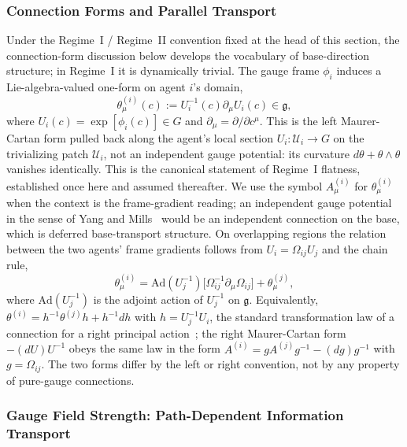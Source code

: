 \subsubsection{Connection Forms and Parallel Transport}
\label{sec:connection_forms}

Under the Regime~I / Regime~II convention fixed at the head of this section, the connection-form discussion below develops the vocabulary of base-direction structure; in Regime~I it is dynamically trivial. The gauge frame $\phi_i$ induces a Lie-algebra-valued one-form on agent $i$'s domain,
\begin{equation}
\theta^{(i)}_\mu(c) := U_i^{-1}(c) \partial_\mu U_i(c) \in \mathfrak{g},
\label{eq:connection_form}
\end{equation}
where $U_i(c) = \exp[\phi_i(c)] \in G$ and $\partial_\mu = \partial/\partial c^\mu$. This is the left Maurer-Cartan form pulled back along the agent's local section $U_i: \mathcal{U}_i \to G$ on the trivializing patch $\mathcal{U}_i$, not an independent gauge potential: its curvature $d\theta + \theta \wedge \theta$ vanishes identically. This is the canonical statement of Regime~I flatness, established once here and assumed thereafter. We use the symbol $A^{(i)}_\mu$ for $\theta^{(i)}_\mu$ when the context is the frame-gradient reading; an independent gauge potential in the sense of Yang and Mills~\cite{Yang1954, Utiyama1956} would be an independent connection on the base, which is deferred base-transport structure. On overlapping regions the relation between the two agents' frame gradients follows from $U_i = \Omega_{ij} U_j$ and the chain rule,
\begin{equation}
\theta^{(i)}_\mu = \mathrm{Ad}(U_j^{-1})\big[\Omega_{ij}^{-1} \partial_\mu \Omega_{ij}\big] + \theta^{(j)}_\mu,
\label{eq:theta_overlap_relation}
\end{equation}
where $\mathrm{Ad}(U_j^{-1})$ is the adjoint action of $U_j^{-1}$ on $\mathfrak{g}$. Equivalently, $\theta^{(i)} = h^{-1}\theta^{(j)}h + h^{-1}dh$ with $h = U_j^{-1}U_i$, the standard transformation law of a connection for a right principal action~\cite{Nakahara2003, WuYang1975}; the right Maurer-Cartan form $-(dU)U^{-1}$ obeys the same law in the form $A^{(i)} = gA^{(j)}g^{-1} - (dg)g^{-1}$ with $g = \Omega_{ij}$. The two forms differ by the left or right convention, not by any property of pure-gauge connections.

\subsubsection{Gauge Field Strength: Path-Dependent Information Transport}
\label{sec:field_strength}

